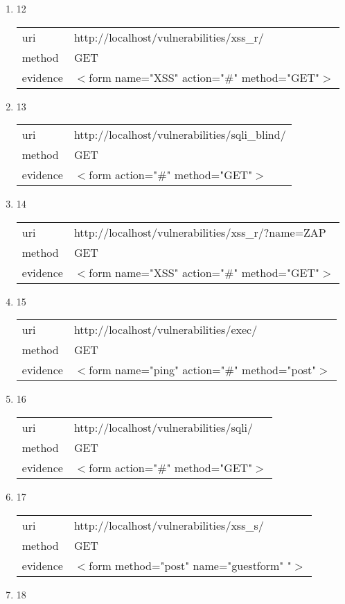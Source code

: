 \documentclass[10pt]{article}
\begin{document}
\begin{itemize}
\begin{enumerate}
\item[] 12
\begin{tabular}{| l | p{14cm}}
uri & http://localhost/vulnerabilities/xss{\_}r/ \\
method & GET \\
evidence & $<$form name="XSS" action="\#" method="GET"$>$ \\
\end{tabular}
\item[] 13
\begin{tabular}{| l | p{14cm}}
uri & http://localhost/vulnerabilities/sqli{\_}blind/ \\
method & GET \\
evidence & $<$form action="\#" method="GET"$>$ \\
\end{tabular}
\item[] 14
\begin{tabular}{| l | p{14cm}}
uri & http://localhost/vulnerabilities/xss{\_}r/?name=ZAP \\
method & GET \\
evidence & $<$form name="XSS" action="\#" method="GET"$>$ \\
\end{tabular}
\item[] 15
\begin{tabular}{| l | p{14cm}}
uri & http://localhost/vulnerabilities/exec/ \\
method & GET \\
evidence & $<$form name="ping" action="\#" method="post"$>$ \\
\end{tabular}
\item[] 16
\begin{tabular}{| l | p{14cm}}
uri & http://localhost/vulnerabilities/sqli/ \\
method & GET \\
evidence & $<$form action="\#" method="GET"$>$ \\
\end{tabular}
\item[] 17
\begin{tabular}{| l | p{14cm}}
uri & http://localhost/vulnerabilities/xss{\_}s/ \\
method & GET \\
evidence & $<$form method="post" name="guestform" "$>$ \\
\end{tabular}
\item[] 18
\begin{tabular}{| l | p{14cm}}

\end{tabular}
\end{enumerate}
\end{itemize}
\end{document}
